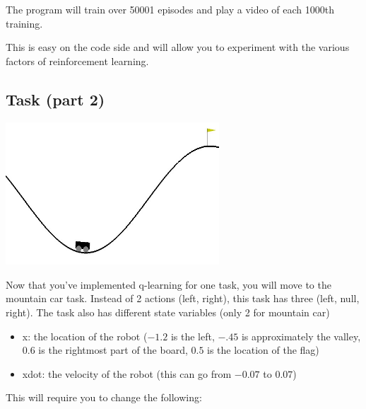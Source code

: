 \documentclass[twoside,10pt]{article}
\begin{document}
The program will train over 50001 episodes and play a video of each
1000th training.

This is easy on the code side and will allow you to experiment with the
various factors of reinforcement learning.

\subsection*{Task (part 2)}\label{task-part-2}

\begin{center}
    \includegraphics[width=8cm]{figs/mountainCar.jpg}
\end{center}

Now that you've implemented q-learning for one task, you will move to
the mountain car task. Instead of 2 actions (left, right), this task has
three (left, null, right). The task also has different state variables
(only 2 for mountain car)

\begin{itemize}

    \item
          x: the location of the robot (\(-1.2\) is the left, \(-.45\) is
          approximately the valley, \(0.6\) is the rightmost part of the board,
          \(0.5\) is the location of the flag)
    \item
          xdot: the velocity of the robot (this can go from \(-0.07\) to
          \(0.07\))
\end{itemize}

This will require you to change the following:
\end{document}
